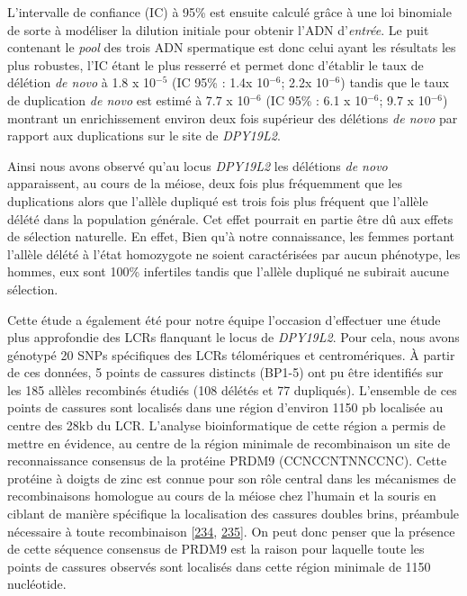 \documentclass[12pt,a4paper,twoside]{ugathesis}
\theoremstyle{definition}
\theoremstyle{definition}
\theoremstyle{definition}
\theoremstyle{remark}
\begin{document}
L'intervalle de confiance (IC) à 95\% est ensuite calculé grâce à une
loi binomiale de sorte à modéliser la dilution initiale pour obtenir
l'ADN d'\emph{entrée}. Le puit contenant le \emph{pool} des trois ADN
spermatique est donc celui ayant les résultats les plus robustes, l'IC
étant le plus resserré et permet donc d'établir le taux de délétion
\emph{de novo} à 1.8 x 10\(^{-5}\) (IC 95\% : 1.4x 10\(^{-6}\); 2.2x
10\(^{-6}\)) tandis que le taux de duplication \emph{de novo} est estimé
à 7.7 x 10\(^{-6}\) (IC 95\% : 6.1 x 10\(^{-6}\); 9.7 x 10\(^{-6}\))
montrant un enrichissement environ deux fois supérieur des délétions
\emph{de novo} par rapport aux duplications sur le site de
\emph{DPY19L2}.

Ainsi nous avons observé qu'au locus \emph{DPY19L2} les délétions
\emph{de novo} apparaissent, au cours de la méiose, deux fois plus
fréquemment que les duplications alors que l'allèle dupliqué est trois
fois plus fréquent que l'allèle délété dans la population générale. Cet
effet pourrait en partie être dû aux effets de sélection naturelle. En
effet, Bien qu'à notre connaissance, les femmes portant l'allèle délété
à l'état homozygote ne soient caractérisées par aucun phénotype, les
hommes, eux sont 100\% infertiles tandis que l'allèle dupliqué ne
subirait aucune sélection.

Cette étude a également été pour notre équipe l'occasion d'effectuer une
étude plus approfondie des LCRs flanquant le locus de \emph{DPY19L2}.
Pour cela, nous avons génotypé 20 SNPs spécifiques des LCRs télomériques
et centromériques. À partir de ces données, 5 points de cassures
distincts (BP1-5) ont pu être identifiés sur les 185 allèles recombinés
étudiés (108 délétés et 77 dupliqués). L'ensemble de ces points de
cassures sont localisés dans une région d'environ 1150 pb localisée au
centre des 28kb du LCR. L'analyse bioinformatique de cette région a
permis de mettre en évidence, au centre de la région minimale de
recombinaison un site de reconnaissance consensus de la protéine PRDM9
(CCNCCNTNNCCNC). Cette protéine à doigts de zinc est connue pour son
rôle central dans les mécanismes de recombinaisons homologue au cours de
la méiose chez l'humain et la souris en ciblant de manière spécifique la
localisation des cassures doubles brins, préambule nécessaire à toute
recombinaison {[}\protect\hyperlink{ref-Parvanov2010}{234},
\protect\hyperlink{ref-Baudat2010}{235}{]}. On peut donc penser que la
présence de cette séquence consensus de PRDM9 est la raison pour
laquelle toute les points de cassures observés sont localisés dans cette
région minimale de 1150 nucléotide.
\end{document}
